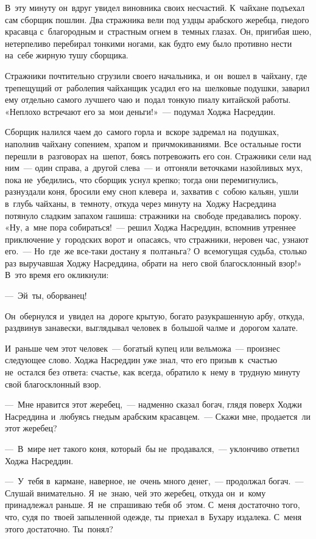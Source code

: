 \documentclass[12pt,a4paper]{book}
\begin{document}
В~эту минуту он~вдруг увидел виновника своих несчастий. К~чайхане подъехал сам сборщик пошлин. Два стражника вели под уздцы арабского жеребца, гнедого красавца с~благородным и~страстным огнем в~темных глазах. Он, пригибая шею, нетерпеливо перебирал тонкими ногами, как будто ему было противно нести на~себе жирную тушу сборщика.

Стражники почтительно сгрузили своего начальника, и~он~вошел в~чайхану, где трепещущий от~раболепия чайханщик усадил его на~шелковые подушки, заварил ему отдельно самого лучшего чаю и~подал тонкую пиалу китайской работы. «Неплохо встречают его за~мои деньги!»~— подумал Ходжа Насреддин.

Сборщик налился чаем до~самого горла и~вскоре задремал на~подушках, наполнив чайхану сопением, храпом и~причмокиваниями. Все остальные гости перешли в~разговорах на~шепот, боясь потревожить его сон. Стражники сели над ним~— один справа, а~другой слева~— и~отгоняли веточками назойливых мух, пока не~убедились, что сборщик уснул крепко; тогда они перемигнулись, разнуздали коня, бросили ему сноп клевера~и, захватив с~собою кальян, ушли в~глубь чайханы, в~темноту, откуда через минуту на~Ходжу Насреддина потянуло сладким запахом гашиша: стражники на~свободе предавались пороку. «Ну, а~мне пора собираться!~— решил Ходжа Насреддин, вспомнив утреннее приключение у~городских ворот и~опасаясь, что стражники, неровен час, узнают его.~— Но~где~же все-таки достану я~полтаньга? О~всемогущая судьба, столько раз выручавшая Ходжу Насреддина, обрати на~него свой благосклонный взор!» В~это время его окликнули:

—~Эй~ты, оборванец!

Он~обернулся и~увидел на~дороге крытую, богато разукрашенную арбу, откуда, раздвинув занавески, выглядывал человек в~большой чалме и~дорогом халате.

И~раньше чем этот человек~— богатый купец или вельможа~— произнес следующее слово. Ходжа Насреддин уже знал, что его призыв к~счастью не~остался без ответа: счастье, как всегда, обратило к~нему в~трудную минуту свой благосклонный взор.

—~Мне нравится этот жеребец,~— надменно сказал богач, глядя поверх Ходжи Насреддина и~любуясь гнедым арабским красавцем.~— Скажи мне, продается~ли этот жеребец?

—~В~мире нет такого коня, который~бы не~продавался,~— уклончиво ответил Ходжа Насреддин.

—~У~тебя в~кармане, наверное, не~очень много денег,~— продолжал богач.~— Слушай внимательно. Я~не~знаю, чей это жеребец, откуда он~и~кому принадлежал раньше. Я~не~спрашиваю тебя об~этом. С~меня достаточно того, что, судя по~твоей запыленной одежде, ты~приехал в~Бухару издалека. С~меня этого достаточно. Ты~понял?
\end{document}
